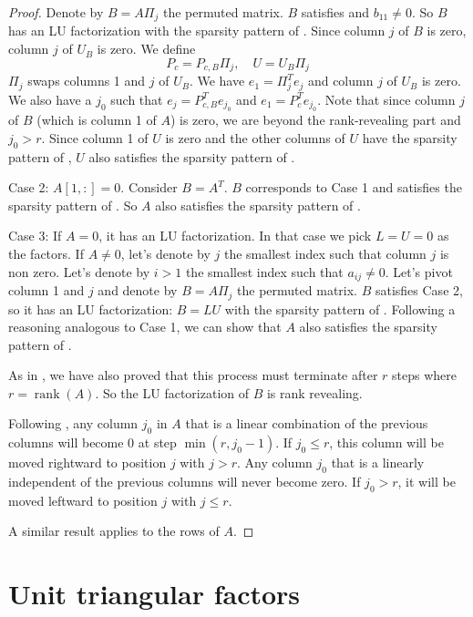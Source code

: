 \documentclass{article}
\DeclareMathOperator{\rk}{rank}
\begin{document}
\begin{proof}
    Denote by $B = A \Pi_j$ the permuted matrix. $B$ satisfies  and $b_{11} \neq 0$. So $B$ has an LU factorization with the sparsity pattern of . Since column $j$ of $B$ is zero, column $j$ of $U_{B}$ is zero. We define
    \[ P_c = P_{c,B} \Pi_j, \quad U = U_B \Pi_j \]
    $\Pi_j$ swaps columns 1 and $j$ of $U_{B}$. We have $e_1 = \Pi_j^T e_j$ and column $j$ of $U_{B}$ is zero. We also have a $j_0$ such that $e_j = P_{c,B}^T e_{j_0}$ and $e_1 = P_c^T e_{j_0}$. Note that since column $j$ of $B$ (which is column 1 of $A$) is zero, we are beyond the rank-revealing part and $j_0 > r$. Since column 1 of $U$ is zero and the other columns of $U$ have the sparsity pattern of , $U$ also satisfies the sparsity pattern of .

    Case 2: $A[1,:] = 0$. Consider $B = A^T$. $B$ corresponds to Case 1 and satisfies the sparsity pattern of . So $A$ also satisfies the sparsity pattern of .

    Case 3: If $A = 0$, it has an LU factorization. In that case we pick $L=U=0$ as the factors. If $A \neq 0$, let's denote by $j$ the smallest index such that column $j$ is non zero. Let's denote by $i > 1$ the smallest index such that $a_{ij} \neq 0$. Let's pivot column 1 and $j$ and denote by $B = A \Pi_j$ the permuted matrix. $B$ satisfies Case 2, so it has an LU factorization: $B = L U$ with the sparsity pattern of . Following a reasoning analogous to Case 1, we can show that $A$ also satisfies the sparsity pattern of .

    As in , we have also proved that this process must terminate after $r$ steps where $r = \rk(A)$. So the LU factorization of $B$ is rank revealing.

    Following , any column $j_0$ in $A$ that is a linear combination of the previous columns will become 0 at step $\min(r,j_0-1)$. If $j_0 \le r$, this column will be moved rightward to position $j$ with $j > r$. Any column $j_0$ that is a linearly independent of the previous columns will never become zero. If $j_0 > r$, it will be moved leftward to position $j$ with $j \le r$.

    A similar result applies to the rows of $A$.
\end{proof}

\section{Unit triangular factors}\label{sec:unit_triangular}
\end{document}
